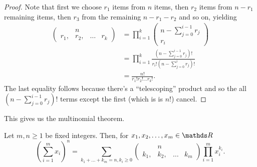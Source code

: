 \begin{proof}
Note that first we choose $r_{1}$ items from $n$ items, then $r_{2}$
items from $n-r_{1}$ remaining items, then $r_{3}$ from the remaining
$n-r_{1}-r_{2}$ and so on, yielding
\begin{align*}
\left(\begin{array}{cccc}
 & n\\
r_{1}, & r_{2}, & \ldots & r_{k}
\end{array}\right) & =\prod_{i=1}^{k}\left(\begin{array}{c}
n-\sum_{j=0}^{i-1}r_{j}\\
r_{i}
\end{array}\right)\\
 & =\prod_{i=1}^{k}\frac{\left(n-\sum_{j=0}^{i-1}r_{j}\right)!}{r_{i}!\left(n-\sum_{j=0}^{i}r_{j}\right)!}\\
 & =\frac{n!}{r_{1}!r_{2}!\ldots r_{k}!}.
\end{align*}
The last equality follows because there's a ``telescoping'' product
and so the all $\left(n-\sum_{j=0}^{i-1}r_{j}\right)!$ terms except
the first (which is is $n!$) cancel.
\end{proof}
This gives us the multinomial theorem.
\begin{thm}
\label{thm:multinomialTheorem}Let $m,n\geq1$ be fixed integers.
Then, for $x_{1},x_{2},\ldots,x_{m}\in\R$
\[
\left(\sum_{i=1}^{m}x_{i}\right)^{n}=\sum_{k_{1}+\ldots+k_{m}=n,k_{i}\geq0}\left(\begin{array}{cccc}
 & n\\
k_{1}, & k_{2}, & \ldots & k_{m}
\end{array}\right)\prod_{i=1}^{m}x_{i}^{k_{i}}.
\]
\end{thm}

